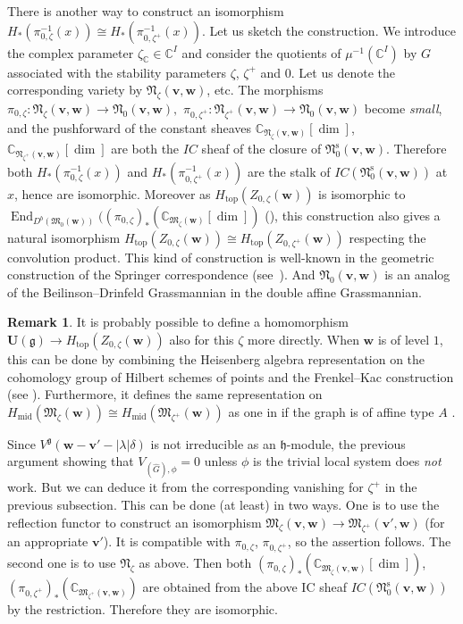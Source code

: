 \documentclass[pdftex]{sigma}
\theoremstyle{definition}
\newtheorem{Remark}[equation]{Remark}
\numberwithin{equation}{section}
\newcommand{\C}{{\mathbb C}}
\newcommand{\g}{{\mathfrak g}}
\newcommand{\End}{\operatorname{End}}
\newcommand{\M}{{\mathfrak M}} %
\newcommand{\bv}{{\mathbf v}} %
\newcommand{\bw}{{\mathbf w}} %
\newcommand{\topdeg}{{\operatorname{top}}} %
\newcommand{\bU}{\mathbf U} %
\begin{document}
There is another way to construct an isomorphism
$H_{*}(\pi_{0,\zeta}^{-1}(x))\cong
H_{*}(\pi_{0,\zeta^+}^{-1}(x))$.
%
Let us sketch the construction. We introduce the complex parameter
$\zeta_\C\in\C^I$ and consider the quotients of $\mu^{-1}(\C^I)$ by
$G$ associated with the stability parameters $\zeta$, $\zeta^+$ and
$0$. Let us denote the corresponding variety by $\mathfrak
N_{\zeta}(\bv,\bw)$, etc.
%
The morphisms
\(
 \pi_{0,\zeta}\colon\mathfrak N_{\zeta}(\bv,\bw) \to
  \mathfrak N_0(\bv,\bw),
\)
\(
 \pi_{0,\zeta^+}\colon\mathfrak N_{\zeta^+}(\bv,\bw) \to
  \mathfrak N_0(\bv,\bw)
\)
become {\it small\/}, and the pushforward of the constant sheaves
$\C_{\mathfrak N_\zeta(\bv,\bw)}[\dim]$, $\C_{\mathfrak N_{\zeta^+}(\bv,\bw)}[\dim]$
are both the $IC$ sheaf of the closure of $\mathfrak
N_0^{\operatorname{s}}(\bv,\bw)$.
Therefore both $H_{*}(\pi_{0,\zeta}^{-1}(x))$ and
$H_{*}(\pi_{0,\zeta^+}^{-1}(x))$ are the stalk of
$IC(\mathfrak N_0^{\operatorname{s}}(\bv,\bw))$ at $x$, hence are
isomorphic.
%
Moreover as $H_{\topdeg}(Z_{0,\zeta}(\bw))$ is isomorphic to
$\End_{D^b(\M_0(\bw))}((\pi_{0,\zeta})_*(\C_{\M_\zeta(\bw)}[\dim])$
(\cite[8.9.6]{CG}), this construction also gives a natural isomorphism
$H_{\topdeg}(Z_{0,\zeta}(\bw))\cong H_{\topdeg}(Z_{0,\zeta^+}(\bw))$
respecting the convolution product.
%
This kind of construction is well-known in the geometric construction
of the Springer correspondence (see~\cite{Lu-Green}). And
$\mathfrak N_0(\bv,\bw)$ is an analog of the Beilinson--Drinfeld
Grassmannian in the double af\/f\/ine Grassmannian.

\begin{Remark}\label{rem:Frenkel-Kac}
  It is probably possible to def\/ine a homomorphism $\bU(\g) \to
  H_{\topdeg}(Z_{0,\zeta}(\bw))$ also for this $\zeta$ more directly.
  When $\bw$ is of level $1$, this can be done by combining the
  Heisenberg algebra representation on the cohomology group of Hilbert
  schemes of points \cite{Lecture} and the Frenkel--Kac construction
  \cite[\S~14]{Kac} (see \cite{Grojnowski}). Furthermore, it def\/ines
  the same representation on
  $H_{\operatorname{mid}}(\M_\zeta(\bw))\cong
  H_{\operatorname{mid}}(\M_{\zeta^+}(\bw))$ as one in \cite{Na-alg}
  if the graph is of af\/f\/ine type $A$ \cite{Nagao-2007}.
\end{Remark}

Since $V^\g(\bw - \bv' - |\lambda|\delta)$ is not irreducible as an
$\mathfrak h$-module, the previous argument showing that $V_{(\widehat
  G),\phi} = 0$ unless $\phi$ is the trivial local system does {\it
  not\/} work. But we can deduce it from the corresponding vanishing
for $\zeta^+$ in the previous subsection. This can be done (at least)
in two ways. One is to use the ref\/lection functor \cite{Na-reflect} to
construct an isomorphism $\M_\zeta(\bv,\bw)\to\M_{\zeta^+}(\bv',\bw)$
(for an appropriate $\bv'$). It is compatible with $\pi_{0,\zeta}$,
$\pi_{0,\zeta^+}$, so the assertion follows. The second one is to use
$\mathfrak N_{\zeta}$ as above. Then both
$(\pi_{0,\zeta})_*(\C_{\M_\zeta(\bv,\bw)}[\dim])$,
$(\pi_{0,\zeta^+})_*(\C_{\M_{\zeta^+}(\bv,\bw)})$ are obtained from
the above IC sheaf $IC(\mathfrak N_0^{\operatorname{s}}(\bv,\bw))$ by
the restriction. Therefore they are isomorphic.
\end{document}

